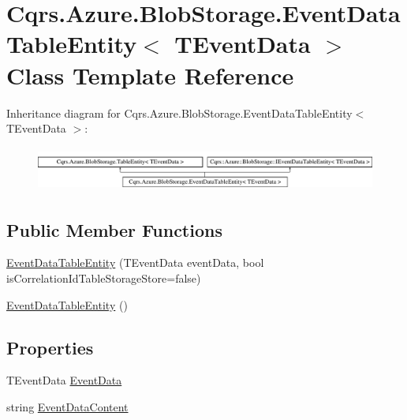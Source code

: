 \hypertarget{classCqrs_1_1Azure_1_1BlobStorage_1_1EventDataTableEntity}{}\section{Cqrs.\+Azure.\+Blob\+Storage.\+Event\+Data\+Table\+Entity$<$ T\+Event\+Data $>$ Class Template Reference}
\label{classCqrs_1_1Azure_1_1BlobStorage_1_1EventDataTableEntity}
Inheritance diagram for Cqrs.\+Azure.\+Blob\+Storage.\+Event\+Data\+Table\+Entity$<$ T\+Event\+Data $>$\+:\begin{figure}[H]
\begin{center}
\leavevmode
\includegraphics[height=1.477572cm]{classCqrs_1_1Azure_1_1BlobStorage_1_1EventDataTableEntity}
\end{center}
\end{figure}
\subsection*{Public Member Functions}
\begin{DoxyCompactItemize}
\item 
\hyperlink{classCqrs_1_1Azure_1_1BlobStorage_1_1EventDataTableEntity_a90c39733d651a5a71497909089e67c1a_a90c39733d651a5a71497909089e67c1a}{Event\+Data\+Table\+Entity} (T\+Event\+Data event\+Data, bool is\+Correlation\+Id\+Table\+Storage\+Store=false)
\item 
\hyperlink{classCqrs_1_1Azure_1_1BlobStorage_1_1EventDataTableEntity_a6785ad2dd88c6db1ec4a2d8d474b557d_a6785ad2dd88c6db1ec4a2d8d474b557d}{Event\+Data\+Table\+Entity} ()
\end{DoxyCompactItemize}
\subsection*{Properties}
\begin{DoxyCompactItemize}
\item 
T\+Event\+Data \hyperlink{classCqrs_1_1Azure_1_1BlobStorage_1_1EventDataTableEntity_a906bcb5198f91069413fc1d8e848866a_a906bcb5198f91069413fc1d8e848866a}{Event\+Data}
\item 
string \hyperlink{classCqrs_1_1Azure_1_1BlobStorage_1_1EventDataTableEntity_a96b0a7c91d33d469e047c6bd5089d8de_a96b0a7c91d33d469e047c6bd5089d8de}{Event\+Data\+Content}
\end{DoxyCompactItemize}
